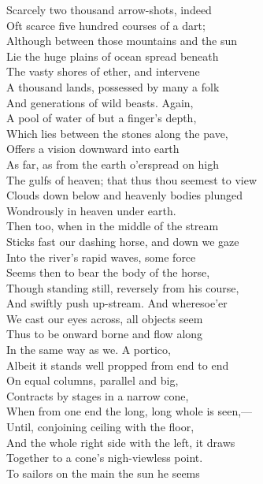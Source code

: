 Scarcely two thousand arrow-shots, indeed\\
Oft scarce five hundred courses of a dart;\\
Although between those mountains and the sun\\
Lie the huge plains of ocean spread beneath\\
The vasty shores of ether, and intervene\\
A thousand lands, possessed by many a folk\\
And generations of wild beasts. Again,\\
A pool of water of but a finger's depth,\\
Which lies between the stones along the pave,\\
Offers a vision downward into earth\\
As far, as from the earth o'erspread on high\\
The gulfs of heaven; that thus thou seemest to view\\
Clouds down below and heavenly bodies plunged\\
Wondrously in heaven under earth.\\
Then too, when in the middle of the stream\\
Sticks fast our dashing horse, and down we gaze\\
Into the river's rapid waves, some force\\
Seems then to bear the body of the horse,\\
Though standing still, reversely from his course,\\
And swiftly push up-stream. And wheresoe'er\\
We cast our eyes across, all objects seem\\
Thus to be onward borne and flow along\\
In the same way as we. A portico,\\
Albeit it stands well propped from end to end\\
On equal columns, parallel and big,\\
Contracts by stages in a narrow cone,\\
When from one end the long, long whole is seen,—\\
Until, conjoining ceiling with the floor,\\
And the whole right side with the left, it draws\\
Together to a cone's nigh-viewless point.\\
To sailors on the main the sun he seems\\
